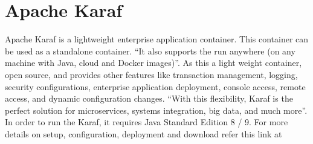 \section{Apache Karaf}

Apache Karaf is a lightweight enterprise application container. This
container can be used as a standalone container.  ``It also supports
the run anywhere (on any machine with Java, cloud and Docker
images)''\cite{hid-sp18-514-apachekaraf}.  As this a light weight
container, open source, and provides other features like transaction
management\cite{karaf_transaction}, logging, security configurations,
enterprise application deployment, console access, remote access, and
dynamic configuration changes. “With this flexibility, Karaf is the
perfect solution for microservices, systems integration, big data, and
much more”\cite{hid-sp18-514-apachekaraf}.  In order to run the Karaf,
it requires Java Standard Edition 8 / 9. For more details on setup,
configuration, deployment and download refer this link at



